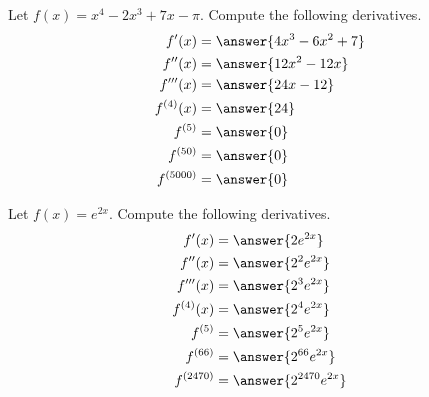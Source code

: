 \documentclass{ximera}
\author{Nela Lakos \and Kyle Parsons}
\begin{document}
\begin{exercise}

Let $f(x) = x^4 -2x^3 + 7x - \pi$.  Compute the following derivatives.
\begin{align*}
f'(x) &= \answer{4x^3 - 6x^2 + 7}\\
f''(x) &= \answer{12x^2 - 12x}\\
f'''(x) &= \answer{24x - 12}\\
f^{(4)}(x) &= \answer{24}\\
f^{(5)} &= \answer{0}\\
f^{(50)} &= \answer{0}\\
f^{(5000)} &= \answer{0}\\
\end{align*}

\begin{exercise}

Let $\displaystyle{f(x) = e^{2x}}$.  Compute the following derivatives.
\begin{align*}
f'(x) &= \answer{2e^{2x}}\\
f''(x) &= \answer{2^2 e^{2x}}\\
f'''(x) &= \answer{2^3 e^{2x}}\\
f^{(4)}(x) &= \answer{2^4 e^{2x}}\\
f^{(5)} &= \answer{2^5 e^{2x}}\\
f^{(66)} &= \answer{2^{66} e^{2x}}\\
f^{(2470)} &= \answer{2^{2470} e^{2x}}\\
\end{align*}


\end{exercise}
\end{exercise}
\end{document}
